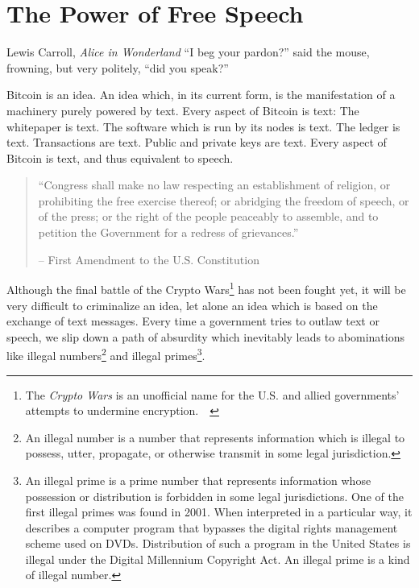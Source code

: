 \chapter{The Power of Free Speech}
\label{les:6}

\begin{chapquote}{Lewis Carroll, \textit{Alice in Wonderland}}
\enquote{I beg your pardon?} said the mouse, frowning, but very politely, \enquote{did you speak?}
\end{chapquote}

Bitcoin is an idea. An idea which, in its current form, is the
manifestation of a machinery purely powered by text. Every aspect of
Bitcoin is text: The whitepaper is text. The software which is run by
its nodes is text. The ledger is text. Transactions are text. Public and
private keys are text. Every aspect of Bitcoin is text, and thus
equivalent to speech.

\begin{quotation}\begin{samepage}
\enquote{Congress shall make no law respecting an establishment of religion,
or prohibiting the free exercise thereof; or abridging the freedom of
speech, or of the press; or the right of the people peaceably to
assemble, and to petition the Government for a redress of grievances.}
\begin{flushright} -- First Amendment to the U.S. Constitution
\end{flushright}\end{samepage}\end{quotation}

Although the final battle of the Crypto Wars\footnote{The \textit{Crypto Wars}
is an unofficial name for the U.S. and allied governments' attempts to undermine
encryption.~\cite{eff-cryptowars}~\cite{wiki:cryptowars}} has not been fought
yet, it will be very difficult to criminalize an idea, let alone an idea which
is based on the exchange of text messages. Every time a government tries to
outlaw text or speech, we slip down a path of absurdity which inevitably leads
to abominations like illegal numbers\footnote{An illegal number is a number that
represents information which is illegal to possess, utter, propagate, or
otherwise transmit in some legal jurisdiction.\cite{wiki:illegal-number}} and
illegal primes\footnote{An illegal prime is a prime number that represents
information whose possession or distribution is forbidden in some legal
jurisdictions. One of the first illegal primes was found in 2001. When
interpreted in a particular way, it describes a computer program that bypasses
the digital rights management scheme used on DVDs. Distribution of such a
program in the United States is illegal under the Digital Millennium Copyright
Act. An illegal prime is a kind of illegal number.\cite{wiki:illegal-prime}}.

